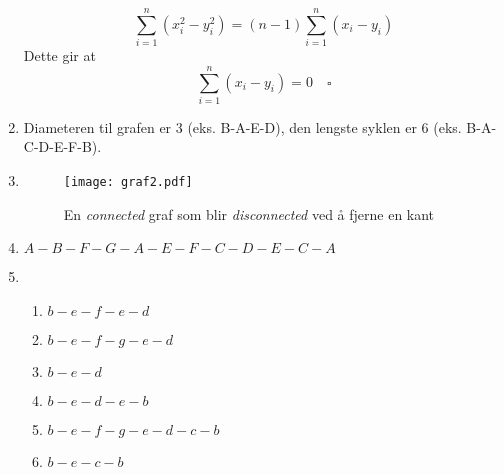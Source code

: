 \documentclass[a4paper, 12pt]{article}  %
\begin{document}
\begin{enumerate}
    \[\sum^n_{i=1}(x^2_i - y^2_i) = (n - 1) \sum^n_{i=1}(x_i - y_i)\]
    Dette gir at \[\sum^n_{i=1}(x_i - y_i) = 0 \quad\square\]
    \item [\boxed{4}] Diameteren til grafen er 3 (eks. B-A-E-D), den lengste syklen er 6 (eks. B-A-C-D-E-F-B).
    \item [\boxed{5}] \text{ }
    \begin{figure*}[h!]
        \centering
        \texttt{[image: graf2.pdf]}
        \caption{En \emph{connected} graf som blir \emph{disconnected} ved å fjerne en kant}
    \end{figure*}
    \item [\boxed{6}] \(A-B-F-G-A-E-F-C-D-E-C-A\)
    \item [\boxed{7}]
    \begin{enumerate}
        \item \(b - e - f - e - d\)
        \item \(b - e - f - g - e - d\)
        \item \(b - e - d\)
        \item \(b - e - d - e - b\)
        \item \(b - e - f - g - e - d - c - b\)
        \item \(b - e - c - b\)
    \end{enumerate}

\end{enumerate}

\end{document}

